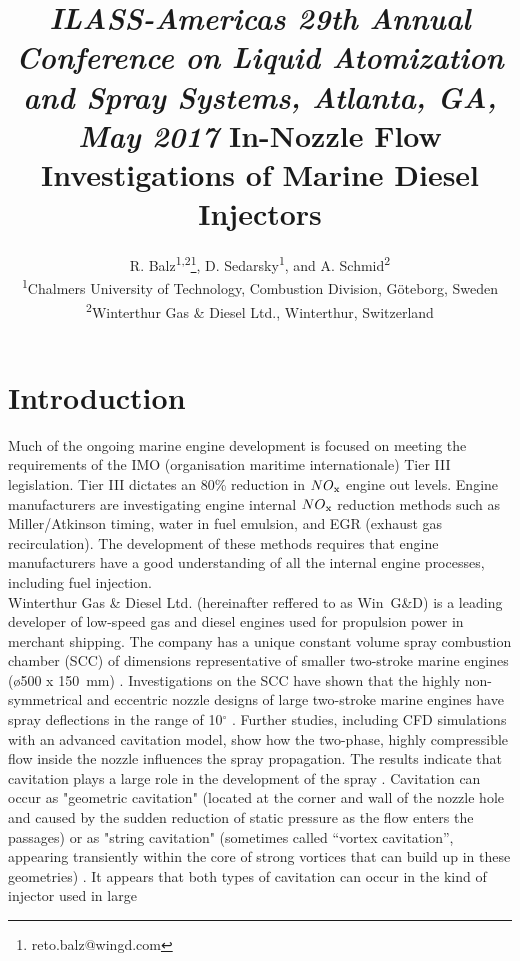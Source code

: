\documentclass[letterpaper,twocolumn,10pt]{ilass}
\title{\vspace{-0.25in}
      {\small \em
       ILASS-Americas 29th Annual Conference on Liquid Atomization and Spray Systems,
       Atlanta, GA, May 2017} \newline\newline
      {\large\bf In-Nozzle Flow Investigations of Marine Diesel Injectors} }
\author{\large
        R. Balz\textsuperscript{1,2}\footnote{reto.balz@wingd.com},
				D. Sedarsky\textsuperscript{1},
				and A. Schmid\textsuperscript{2}\\
				\textsuperscript{1}Chalmers University of Technology, Combustion Division,
				G\"oteborg, Sweden\\
				\textsuperscript{2}Winterthur Gas \& Diesel Ltd., Winterthur,
				Switzerland}
\date{\normalsize  \centerline{\bf Abstract} \vspace{0.05in}
\begin{minipage}{6.5in} \normalsize
Injector geometries of large marine two-stroke diesel engines differ extensively from
configurations typically used in diesel engines for automotive applications.
The injector orifices are arranged asymmetrically, as all the bores face a similar direction.
Due to this setup, the orifices are also distributed eccentric with respect to the central axis
of the injector. Experiments have shown that sprays from such orifices propagate non-symmetrical
to the nominal axis of the orifice. Those spray deviations can lead to wall wetting which
increases fuel consumption, emissions, component temperatures and loss of lubrication film.
To further investigate the in-nozzle flow and how it affects the spray morphology for large
marine two-stroke diesel engine injectors, experiments were performed using transparent nozzles
made of PMMA and real condition injection pressures and air densities of up to 80~MPa and
35~kg/m$^3$, respectively. The experiments were performed with diesel fuel in a newly built
spray chamber to cope with the spray backsplash under ambient temperature conditions.
The nozzle used was an orthogonally arranged 0.75~mm diameter one-hole setup that matches large
marine two-stroke diesel engines injector nozzle diameters. High-speed shadowgraphie using a
far-field microscope was applied to visualize the cavitation in the nozzle during the complete
injection process.
The evaluation of cavitation regions in the nozzle with various Cavitation numbers delivers
valued validation data for cavitation CFD models.
\end{minipage} \vspace{-0.25in}}
\begin{document}
\ifpdf
{}
\else
{}
\fi

\maketitle

\clearpage

\setcounter{page}{2}


\section*{Introduction} 
Much of the ongoing marine engine development is focused on meeting the requirements of the
IMO (organisation maritime internationale) Tier III legislation. Tier III dictates an 80\%
reduction in $NO\textsubscript{x}$ engine out levels. Engine manufacturers are investigating
engine internal $NO\textsubscript{x}$ reduction methods such as Miller/Atkinson timing, water
in fuel emulsion, and EGR (exhaust gas recirculation). The development of these methods requires
that engine manufacturers have a good understanding of all the internal engine processes,
including fuel injection.\\
%
Winterthur Gas \& Diesel Ltd. (hereinafter reffered to as Win~G\&D) is a leading developer of
low-speed gas and diesel engines used for propulsion power in merchant shipping. The company 
has a unique constant volume spray combustion chamber (SCC) of dimensions representative of
smaller two-stroke marine engines (\o 500 x 150~mm) \cite{Herrmann2011}. Investigations on the
SCC have shown that the highly non-symmetrical and eccentric nozzle designs of large two-stroke
marine engines have spray deflections in the range of 10$^{\circ}$ \cite{Schmid2013}. Further
studies, including CFD simulations with an advanced cavitation model, show how the two-phase,
highly compressible flow inside the nozzle influences the spray propagation. The results
indicate that cavitation plays a large role in the development of the spray \cite{Schmid2014}.
Cavitation can occur as "geometric cavitation" (located at the corner and wall of the nozzle
hole and caused by the sudden reduction of static pressure as the flow enters the passages)
or as "string cavitation" (sometimes called “vortex cavitation”, appearing transiently within
the core of strong vortices that can build up in these geometries) \cite{Andriotis2008}.
It appears that both types of cavitation can occur in the kind of injector used in large
\end{document}
